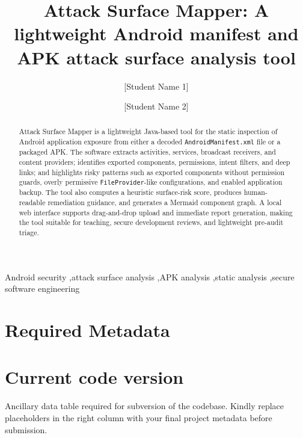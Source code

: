 \documentclass[preprint,12pt,a4paper]{elsarticle}
\begin{document}
\renewcommand{\labelenumii}{\arabic{enumi}.\arabic{enumii}}

\begin{frontmatter}

\title{Attack Surface Mapper: A lightweight Android manifest and APK attack surface analysis tool}

\author{[Student Name 1]}
\author{[Student Name 2]}
\address{[Department / School], [University], [City], [Country]}

\begin{abstract}
Attack Surface Mapper is a lightweight Java-based tool for the static inspection of Android application exposure from either a decoded \texttt{AndroidManifest.xml} file or a packaged APK. The software extracts activities, services, broadcast receivers, and content providers; identifies exported components, permissions, intent filters, and deep links; and highlights risky patterns such as exported components without permission guards, overly permissive \texttt{FileProvider}-like configurations, and enabled application backup. The tool also computes a heuristic surface-risk score, produces human-readable remediation guidance, and generates a Mermaid component graph. A local web interface supports drag-and-drop upload and immediate report generation, making the tool suitable for teaching, secure development reviews, and lightweight pre-audit triage.
\end{abstract}

\begin{keyword}
Android security \sep attack surface analysis \sep APK analysis \sep static analysis \sep secure software engineering
\end{keyword}

\end{frontmatter}

\section*{Required Metadata}

\section*{Current code version}

Ancillary data table required for subversion of the codebase. Kindly replace placeholders in the right column with your final project metadata before submission.
\end{document}
